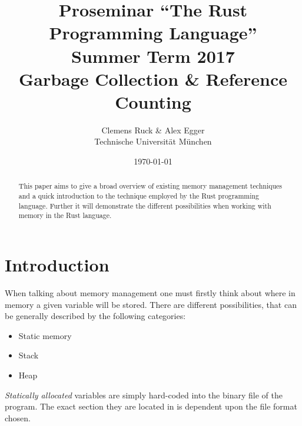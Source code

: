 \documentclass[twocolumn]{article}
\author{Clemens Ruck \& Alex Egger\\ Technische Universit\"at M\"unchen}
\title{Proseminar ``The Rust Programming Language'' \\
       Summer Term 2017 \\
       {\bf Garbage Collection \& Reference Counting}
}
\date{\today}
\begin{document}
\maketitle

\begin{abstract}
This paper aims to give a broad overview of existing memory management techniques
and a quick introduction to the technique employed by the Rust programming language.
Further it will demonstrate the different possibilities when working with memory in
the Rust language.
\end{abstract}

\section{Introduction}

\label{introduction}

When talking about memory management one must firstly think about
where in memory a given variable will be stored. There are different
possibilities, that can be generally described by the following categories:
\begin{itemize}
        \item Static memory
        \item Stack
        \item Heap
\end{itemize}
\textit{Statically allocated} variables are simply hard-coded into the binary file of the program.
The exact section they are located in is dependent upon the file format chosen.
\end{document}
